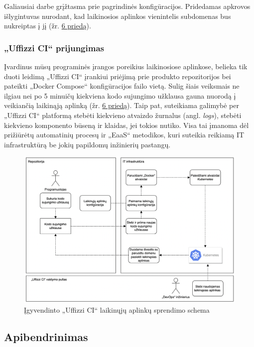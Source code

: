 \documentclass{VUMIFPSkursinis}
\begin{document}
Galiausiai darbe grįžtasma prie pagrindinės konfigūracijos. Pridedamas apkrovos išlygintuvas nurodant, kad laikinosios aplinkos vienintelis subdomenas bus nukreiptas į jį (žr. \hyperref[priedas6]{6 priedą}).

    \subsubsection{„Uffizzi CI“ prijungimas}

Įvardinus mūsų programinės įrangos poreikius laikinosiose aplinkose, belieka tik duoti leidimą „Uffizzi CI“ įrankiui priėjimą prie produkto repozitorijos bei pateikti „Docker Compose“ konfigūracijos failo vietą. Sulig šiais veiksmais ne ilgiau nei po 5 minuičų kiekviena kodo sujungimo užklausa gauna nuorodą į veikiančią laikinąją aplinką (žr. \hyperref[priedas6]{6 priedą}). Taip pat, suteikiama galimybė per „Uffizzi CI“ platformą stebėti kiekvieno atvaizdo žurnalus (angl. \textit{logs}), stebėti kiekvieno komponento būseną ir klaidas, jei tokios nutiko. Visa tai įmanoma dėl prižiūrėtų automatinių procesų ir „EaaS“ metodikos, kuri suteikia reikiamą IT infrastruktūrą be jokių papildomų inžinierių pastangų.

\begin{figure}[H]
    \centering
    \includegraphics[scale=0.55]{img/Veikimas.png}
    \caption{Įgyvendinto „Uffizzi CI“ laikinųjų aplinkų sprendimo schema}
    \label{img:mlp}
\end{figure}

\subsection{Apibendrinimas}
\end{document}
